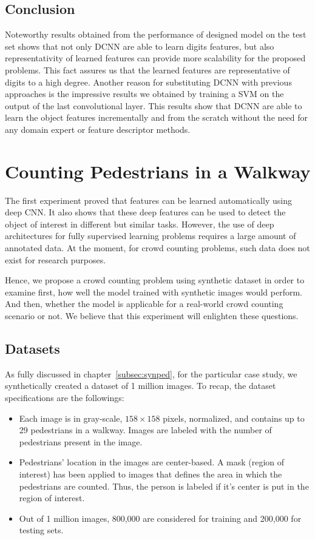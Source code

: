 \subsection{Conclusion}

Noteworthy results obtained from the performance of designed model on the test set shows that not only DCNN are able to learn digits features, but also representativity of learned features can provide more scalability for the proposed problems. This fact assures us that the learned features are representative of digits to a high degree. Another reason for substituting DCNN with previous approaches is the impressive results we obtained by training a SVM on the output of the last convolutional layer. This results show that DCNN are able to learn the object features incrementally and from the scratch without the need for any domain expert or feature descriptor methods. 

\section{Counting Pedestrians in a Walkway}

The first experiment proved that features can be learned automatically using deep CNN. It also shows that these deep features can be used to detect the object of interest in different but similar tasks. However, the use of deep architectures for fully supervised learning problems requires a large amount of annotated data. At the moment, for crowd counting problems, such data does not exist for research purposes. 

Hence, we propose a crowd counting problem using synthetic dataset in order to examine first, how well the model trained with synthetic images would perform. And then, whether the model is applicable for a real-world crowd counting scenario or not. We believe that this experiment will enlighten these questions. 

\subsection{Datasets} 

As fully discussed in chapter~\ref{subsec:synped}, for the particular case study, we synthetically created a dataset of 1 million images. To recap, the dataset specifications are the followings:
\begin{itemize}
\item Each image is in gray-scale, $158\times158$ pixels, normalized, and contains up to 29 pedestrians in a walkway. Images are labeled with the number of pedestrians present in the image.  
\item Pedestrians' location in the images are center-based. A mask (region of interest) has been applied to images that defines the area in which the pedestrians are counted. Thus, the person is labeled if it's center is put in the region of interest.   
\item Out of 1 million images, 800,000 are considered for training and 200,000 for testing sets.
\end{itemize} 

